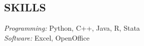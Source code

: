 \documentclass[margin, 10pt]{res} %
\begin{document}
\begin{resume}
%
%
%
%


\section{SKILLS} 

{\sl Programming:} 
Python, C++, Java, R, Stata \\
{\sl Software:} 
Excel, OpenOffice \\


%


\end{resume}
\end{document}

